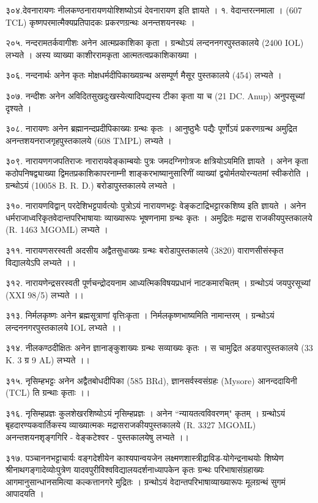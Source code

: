 ३०४.देवनारायणः
नीलकण्ठनारायणयोश्शिष्योऽयं देवनारायण इति ज्ञायते ।
१. वेदान्तरत्नमाला । (607 TCL) कृष्णपरमात्मैक्यप्रतिपादकः प्रकरणग्रन्थः अनन्तशयनस्थः ।

२०५. नन्दरामतर्कवागीशः
अनेन आत्मप्रकाशिका कृता । ग्रन्थोऽयं लन्दननगरपुस्तकालये (2400 IOL) लभ्यते । अस्य व्याख्या काशीररामकृता आत्मतत्वप्रकाशिकाख्या ।

३०६. नन्दनार्थः
अनेन कृतः मोक्षधर्मदीपिकाख्यग्रन्थ असम्पूर्ण मैसूर पुस्तकालये (454) लभ्यते ।

३०७. नन्दीशः
अनेन अविदितसुखदुःखस्येत्यादिपद्यस्य टीका कृता या च (21 DC. Anup) अनुपसूच्यां दृश्यते ।

३०८. नारायणः
अनेन ब्रह्मानन्दप्रदीपिकाख्यः ग्रन्थः कृतः । आनुष्ठुभैः पद्यैः पूर्णोऽयं प्रकरणग्रन्थ अमुद्रित अनन्तशयनराजगृहपुस्तकालये (608 TMPL) लभ्यते ।

३०९. नारायणगजपतिराजः
नारारायवेङ्काम्बयोः पुत्रः जमदग्निगोत्रजः क्षत्रियोऽयमिति ज्ञायते । अनेन कृता कठोपनिषद्व्याख्या द्विमतप्रकाशिकापरनाम्नी शाङ्करभाष्यानुसारिणीं व्याख्यां द्वयोर्मतयोरन्यतमां स्वीकरोति । ग्रन्थोऽयं (10058 B. R. D.) बरोडापुस्तकालये लभ्यते ।

३१०. नारायणविद्वान् 
परदेशिभट्टपार्वत्योः पुत्रोऽयं नारायणभट्टः वेङ्कटाद्रिभट्टारकशिष्य इति ज्ञायते । अनेन धर्मराजाध्वरिकृतवेदान्तपरिभाषायाः व्याख्यारूपः भूषणनामा ग्रन्थः कृतः । अमुद्रितः मद्रास राजकीयपुस्तकालये (R. 1463 MGOML) लभ्यते ।

३११. नारायणसरस्वती
अदसीय अद्वैतसुधाख्यः ग्रन्थः बरोडापुस्तकालये (3820) वाराणसीसंस्कृत विद्यालयेऽपि लभ्यते ।।

३१२. नारायणेन्द्रसरस्वती
पूर्णचन्द्रोदयनाम आध्यत्मिकविषयप्रधानं नाटकमारचितम् । ग्रन्थोऽयं जयपुरसूच्यां (XXI 98/5) लभ्यते ।।

३१३. निर्मलकृष्णः
अनेन ब्रह्मसूत्राणां वृत्तिःकृता । निर्मलकृष्णभाष्यमिति नामान्तरम् । ग्रन्थोऽयं लन्दननगरपुस्तकालये IOL लभ्यते ।।

३१४. नीलकण्ठदीक्षितः
अनेन ज्ञानाङ्कुशाख्यः ग्रन्थः सव्याख्यः कृतः । स चामुद्रित अडयारपुस्तकालये (33 K. 3 ग्र 9 AL) लभ्यते ।।

३१५. नृसिम्हभट्टः
अनेन अद्वैतबोधदीपिका (585 BRd), ज्ञानसर्वस्वसंग्रहः (Mysore) आनन्ददायिनी (TCL) ति ग्रन्थाः कृताः ।।

३१६. नृसिम्हप्रज्ञः
कुलशेखरशिष्योऽयं नृसिम्हप्रज्ञः । अनेन ``न्यायतत्वविवरणम्" कृतम् । ग्रन्थोऽयं बृहदारण्यकवार्तिकस्य व्याख्यात्मकः मद्रासराजकीयपुस्तकालये (R. 3327 MGOML) अनन्तशयनशृङ्गगिरि - वेङ्कटेश्वर - पुस्तकालयेषु लभ्यते ।।

३१७. पञ्चाननभट्टाचार्यः
वङ्गदेशीयेन काश्यपान्वयजेन लक्ष्मणशास्त्रीद्राविड-योगेन्द्रनाथयोः शिष्येण श्रीनाथगङ्गादेव्योःपुत्रेण यादवपुरीविश्वविद्यालयदर्शनाध्यापकेन कृतः ग्रन्थः परिभाषासंग्रहाख्यः आगमानुसान्धानसमित्या कल्कत्तानगरे मुद्रितः । ग्रन्थोऽयं वेदान्तपरिभाषाव्याख्यारूपः मूलग्रन्थं सुगमं आपादयति ।

